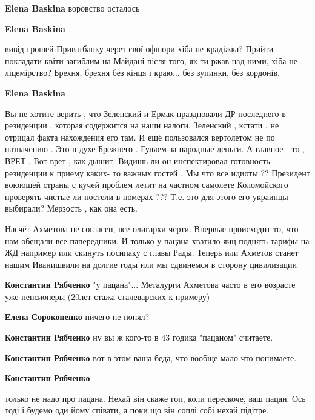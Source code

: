 \begin{itemize}
\begin{itemize}
\textbf{Elena Baskina} воровство осталось

\textbf{Elena Baskina} 

вивід грошей Приватбанку через свої офшори хіба не крадіжка? Прийти покладати
квіти загиблим на Майдані після того, як ти ржав над ними, хіба не ліцемірство?
Брехня, брехня без кінця і краю... без зупинки, без кордонів.

\textbf{Elena Baskina} 

Вы не хотите верить , что Зеленский и Ермак праздновали ДР последнего в
резиденции , которая содержится на наши налоги. Зеленский , кстати , не отрицал
факта нахождения его там. И ещё пользовался вертолетом не по назначению . Это в
духе Брежнего . Гуляем за народные деньги. А главное - то , ВРЕТ . Вот врет ,
как дышит. Видишь ли он инспектировал готовность резиденции к приему каких- то
важных гостей . Мы что все идиоты ?? Президент воюющей страны с кучей проблем
летит на частном самолете Коломойского проверять чистые ли постели в номерах
??? Т.е. это для этого его украинцы выбирали? Мерзость , как она есть.

\end{itemize} %


Насчёт Ахметова не согласен, все олигархи черти. Впервые происходит то, что нам
обещали все папередники. И только у пацана хватило яиц поднять тарифы на ЖД
например или скинуть посипаку с главы Рады. Теперь или Ахметов станет нашим
Иванишвили на долгие годы или мы сдвинемся в сторону цивилизации

\begin{itemize} %
\textbf{Константин Рябченко} "у пацана"... Металурги Ахметова часто в его возрасте уже пенсионеры (20лет стажа сталеварских к примеру)

\textbf{Елена Сороконенко} ничего не понял?

\textbf{Константин Рябченко} ну вы ж кого-то в 43 годика "пацаном" считаете.

\textbf{Константин Рябченко} вот в этом ваша беда, что вообще мало что понимаете.

\textbf{Константин Рябченко} 

только не надо про пацана. Нехай він скаже гоп, коли перескоче, ваш пацан. Ось
тоді і будемо оди йому співати, а поки що він соплі собі нехай підітре.


\end{itemize}
\end{itemize}
